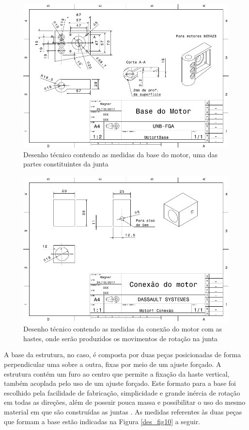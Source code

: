 \begin{figure}[H]
	\centering	\includegraphics[keepaspectratio=true,scale=0.6]{figuras/braco_mecanico_4.png}
	\caption{Desenho técnico contendo as medidas da base do motor, uma das partes constituintes da junta}
	\label{des_fig8}
\end{figure}
\begin{figure}[H]
	\centering	\includegraphics[keepaspectratio=true,scale=0.6]{figuras/braco_mecanico_5.png}
	\caption{Desenho técnico contendo as medidas da conexão do motor com as hastes, onde serão produzidos os movimentos de rotação na junta}
	\label{des_fig9}
\end{figure}
A base da estrutura, no caso, é composta por duas peças posicionadas de forma perpendicular uma sobre a outra, fixas por meio de um ajuste forçado. A estrutura contém um furo ao centro que permite a fixação da haste vertical, também acoplada pelo uso de um ajuste forçado. Este formato para a base foi escolhido pela facilidade de fabricação, simplicidade e grande inércia de rotação em todas as direções, além de possuir pouca massa e possibilitar o uso do mesmo material em que são construídas as juntas \cite{bracomec}. As medidas referentes às duas peças que formam a base estão indicadas na Figura \ref{des_fig10} a seguir.

